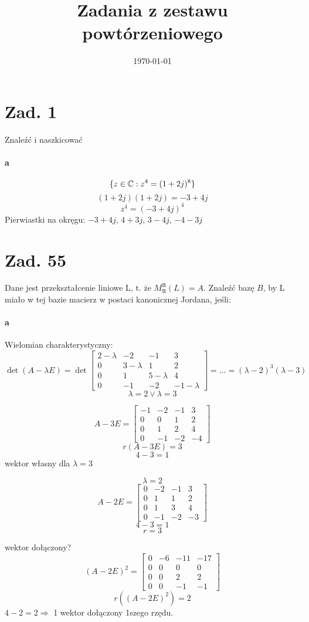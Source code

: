 \documentclass[a4paper,fleqn]{article}
\title{Zadania z zestawu powtórzeniowego}
\author{}
\date{\today}
\begin{document}
	\section*{Zad. 1}
	Znaleźć i naszkicować
	\paragraph{a}
	\[ \{ z\in\mathbb{C} : z^4 = (1+2j)^8 \} \]
	\[ (1+2j)(1+2j) = -3 + 4j \]
	\[ z^4 = (-3+4j)^4 \]
	Pierwiastki na okręgu: $-3+4j$, $4+3j$, $3-4j$, $-4-3j$
	\section*{Zad. 55}
	Dane jest przekształcenie liniowe L, t. że $M_{\mathfrak{A}}^{\mathfrak{A}}(L) = A$.
	Znaleźć bazę $B$, by L miało w tej bazie macierz w postaci kanonicznej Jordana, jeśli:
	\paragraph{a}
	Wielomian charakterystyczny:
	\[ \det(A-\lambda E) = \det \begin{bmatrix}
		2-\lambda & -2 & -1 & 3\\
		0 & 3-\lambda & 1 &2 \\
		0&1 & 5-\lambda & 4 \\
		0 & -1 & -2 &  -1-\lambda
		\end{bmatrix} = \ldots = (\lambda-2)^3 (\lambda-3) \]
	\[ \lambda =2 \lor \lambda = 3 \]

	\[ A-3E = \begin{bmatrix}
		-1 & -2 & -1 & 3 \\
		0&0&1&2\\
		0&1&2&4\\
		0&-1&-2&-4
		\end{bmatrix} \]
	\[ r(A-3E) = 3 \]
	\[ 4-3 = 1 \]
	wektor własny dla $\lambda = 3 $

	\[ \lambda = 2 \]
	\[ A-2E = \begin{bmatrix}
		0 & -2 & -1 & 3 \\
		0& 1 & 1 & 2 \\
		0 & 1 & 3 & 4 \\
		0 & -1 & -2 & -3
		\end{bmatrix}
		\]
	\[ 4 -3 = 1 \]
	\[ r = 3 \]

	wektor dołączony?
	\[ (A-2E)^2 =
		\begin{bmatrix}
			0 & -6 & -11 & -17\\
			0 & 0 & 0 & 0\\
			0 & 0 & 2 & 2\\
			0 & 0 & -1 & -1
		\end{bmatrix} \]
	\[ r((A-2E)^2) = 2 \]
	$ 4 - 2 = 2 \Rightarrow $ 1 wektor dołączony 1szego rzędu.
\end{document}

